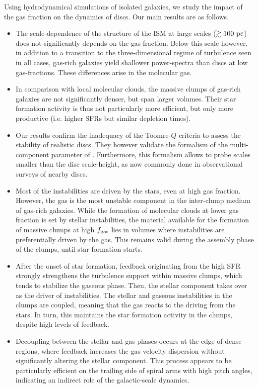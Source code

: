 \documentclass[useAMS,usenatbib]{mnras}
\newcommand{\fgas}{\ensuremath{f_{\rm gas}}\xspace}
\begin{document}
Using hydrodynamical simulations of isolated galaxies, we study the impact of the gas fraction on the dynamics of discs. Our main results are as follows.
\begin{itemize}
\item The scale-dependence of the structure of the ISM at large scales ($\gtrsim 100 \mathrm{~pc}$) does not significantly depends on the gas fraction. Below this scale however, in addition to a transition to the three-dimensional regime of turbulence seen in all cases, gas-rich galaxies yield shallower power-spectra than discs at low gas-fractions. These differences arise in the molecular gas.
\item In comparison with local molecular clouds, the massive clumps of gas-rich galaxies are not significantly denser, but span larger volumes. Their star formation activity is thus not particularly more efficient, but only more productive (i.e. higher SFRs but similar depletion times).
\item Our results confirm the inadequacy of the Toomre-$Q$ criteria to assess the stability of realistic discs. They however validate the formalism of the multi-component parameter of \citet{Romeo2013}. Furthermore, this formalism allows to probe scales smaller than the disc scale-height, as now commonly done in observational surveys of nearby discs.
\item Most of the instabilities are driven by the stars, even at high gas fraction. However, the gas is the most unstable component in the inter-clump medium of gas-rich galaxies. While the formation of molecular clouds at lower gas fraction is set by stellar instabilities, the material available for the formation of massive clumps at high \fgas lies in volumes where instabilities are preferentially driven by the gas. This remains valid during the assembly phase of the clumps, until star formation starts.
\item After the onset of star formation, feedback originating from the high SFR strongly strengthens the turbulence support within massive clumps, which tends to stabilize the gaseous phase. Then, the stellar component takes over as the driver of instabilities. The stellar and gaseous instabilities in the clumps are coupled, meaning that the gas reacts to the driving from the stars. In turn, this maintains the star formation activity in the clumps, despite high levels of feedback. 
\item Decoupling between the stellar and gas phases occurs at the edge of dense regions, where feedback increases the gas velocity dispersion without significantly altering the stellar component. This process appears to be particularly efficient on the trailing side of spiral arms with high pitch angles, indicating an indirect role of the galactic-scale dynamics.

\end{itemize}
\end{document}

